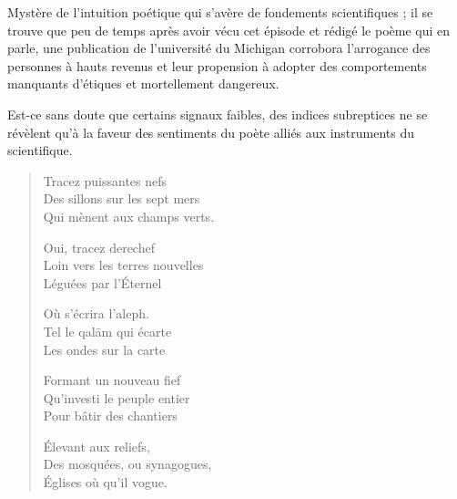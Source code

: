 \begin{prose}

  Mystère de l’intuition poétique qui s’avère de fondements scientifiques ; il se trouve que peu de temps après avoir vécu cet épisode et rédigé le poème qui en parle, une publication de l’université du Michigan corrobora l’arrogance des personnes à hauts revenus et leur propension à adopter des comportements manquants d’étiques et mortellement dangereux.

  Est-ce sans doute que certains signaux faibles, des indices subreptices ne se révèlent qu’à la faveur des  sentiments du poète alliés aux instruments du scientifique.
\end{prose}

\begin{verse}\tercet
  Tracez puissantes nefs\\ 
  Des sillons sur les sept mers\\ 
  Qui mènent aux champs verts.  %

  Oui, tracez derechef\\ 
  Loin vers les terres  nouvelles\\ 
  Léguées par l’Éternel  %

  Où s’écrira l’aleph.\\ 
  Tel le qalām qui écarte\\ 
  Les ondes sur la carte  %

  Formant un nouveau fief\\ 
  Qu’investi le peuple entier\\ 
  Pour bâtir des chantiers  %

  Élevant aux reliefs,\\ 
  Des mosquées, ou synagogues,\\ 
  Églises où qu’il vogue.  %
\end{verse}

